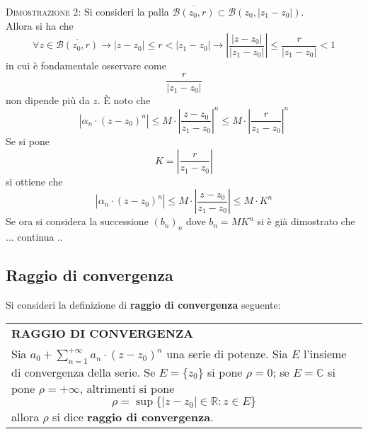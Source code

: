\documentclass[a4paper]{extarticle}
\renewcommand\arraystretch{}
\begin{document}
\vspace{2em}
\noindent
\normalfont \normalsize
\textsc{Dimostrazione 2}: Si consideri la palla $\overline{\mathcal{B}(z_0,r)} \subset \mathcal{B}(z_0, \vert z_1-z_0 \vert)$.\\
Allora si ha che
\[\forall z \in \overline{\mathcal{B}(z_0,r)}  \rightarrow \left \vert z - z_0 \right \vert \leq r < \left \vert z_1 -z_0 \right \vert \rightarrow \left \vert \frac{\left \vert z - z_0 \right \vert}{\left \vert z_1 - z_0 \right \vert} \right \vert \leq \frac{r}{\left \vert z_1 - z_0 \right \vert} < 1\]
in cui è fondamentale osservare come
\[\frac{r}{\left \vert z_1 - z_0 \right \vert}\]
non dipende più da $z$. È noto che
\[\left \vert \alpha_n \cdot (z-z_0)^n \right \vert \leq M \cdot \left \vert \frac{z-z_0}{z_1-z_0}\right \vert^n \leq M \cdot \left \vert \frac{r}{z_1 - z_0} \right \vert ^n\]
Se si pone
\[K = \left \vert \frac{r}{z_1-z_0} \right \vert\]
si ottiene che
\[\left \vert \alpha_n \cdot (z-z_0)^n \right \vert \leq M \cdot \left \vert \frac{z-z_0}{z_1-z_0} \right \vert \leq M \cdot K^n\]
Se ora si considera la successione $(b_n)_n$ dove $b_n=M K^n$ si è già dimostrato che ... continua .. 

\vspace{1em}
\noindent
\subsection{Raggio di convergenza}
Si consideri la definizione di \textbf{raggio di convergenza} seguente:

\vspace{1em}
\setlength{\tabcolsep}{14pt}
\renewcommand{\arraystretch}{2}
\noindent
\begin{tabularx}{\textwidth}{@{}|P|@{}}
    \hline
    {\textbf{RAGGIO DI CONVERGENZA}}\\
    \parbox{\linewidth}{Sia $a_0 + \sum_{n=1}^{+\infty} a_n \cdot (z-z_0)^n$ una serie di potenze. Sia $E$ l'insieme di convergenza della serie. Se $E = \{z_0\}$ si pone $\rho=0$; se $E = \mathbb{C}$ si pone $\rho = +\infty$, altrimenti si pone
    \[\rho = \sup \{\left \vert z-z_0 \right \vert \in \mathbb{R} : z \in E\}\]
    allora $\rho$ si dice \textbf{raggio di convergenza}.\vspace{3mm}}\\
    \hline
\end{tabularx}
\end{document}
